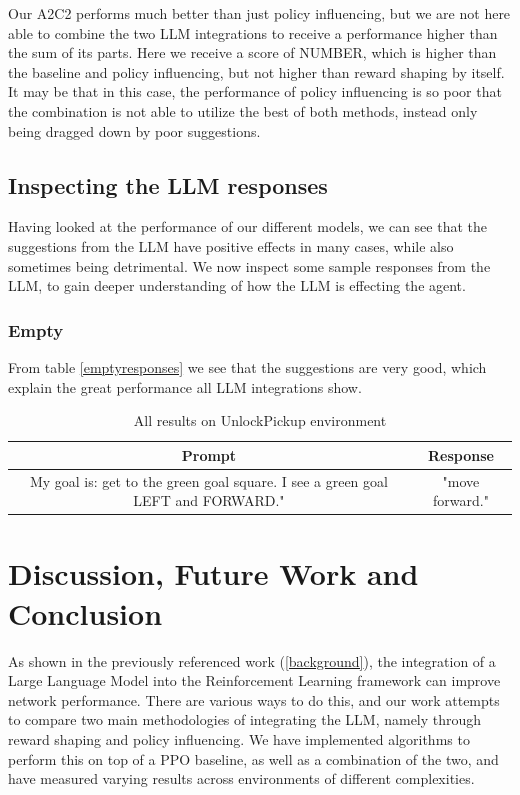 \documentclass[conference]{IEEEtran}
\begin{document}
Our A2C2 performs much better than just policy influencing, but we are not here able to combine the two LLM integrations to receive a performance higher than the sum of its parts. Here we receive a score of NUMBER, which is higher than the baseline and policy influencing, but not higher than reward shaping by itself. It may be that in this case, the performance of policy influencing is so poor that the combination is not able to utilize the best of both methods, instead only being dragged down by poor suggestions.

\subsection{Inspecting the LLM responses}

Having looked at the performance of our different models, we can see that the suggestions from the LLM have positive effects in many cases, while also sometimes being detrimental. We now inspect some sample responses from the LLM, to gain deeper understanding of how the LLM is effecting the agent.

\subsubsection{Empty}

From table \ref{emptyresponses} we see that the suggestions are very good, which explain the great performance all LLM integrations show.

\begin{table}[h]
\caption{All results on UnlockPickup environment}
\begin{center}
\label{unlockpickuptable}
\begin{tabular}{c | c}
Prompt & Response \\
\hline
My goal is: get to the green goal square. I see a green goal LEFT and FORWARD." & "move forward."
\end{tabular}
\end{center}
\end{table}


\section{Discussion, Future Work and Conclusion}

As shown in the previously referenced work (\ref{background}), the integration of a Large Language Model into the Reinforcement Learning framework can improve network performance. There are various ways to do this, and our work attempts to compare two main methodologies of integrating the LLM, namely through reward shaping and policy influencing. We have implemented algorithms to perform this on top of a PPO baseline, as well as a combination of the two, and have measured varying results across environments of different complexities.
\end{document}
